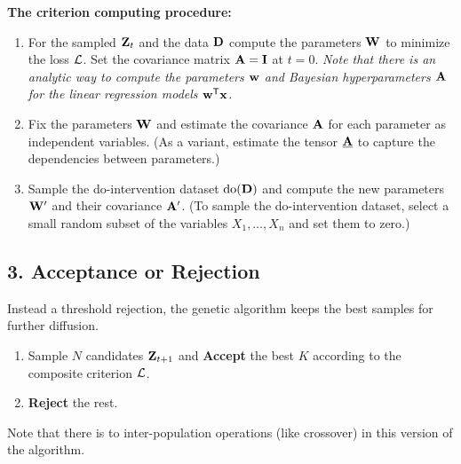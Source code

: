 \documentclass[12pt]{article}
\begin{document}
\clearpage
    \textbf{The criterion computing procedure:}
\begin{enumerate}
    \item For the sampled $\mathbf{Z}_t$ and the data $\mathbf{D}$ compute the parameters $\mathbf{W}$ to minimize the loss $\mathcal{L}$.
    Set the covariance matrix $\mathbf{A} = \mathbf{I}$ at $t=0$.
    \emph{Note that there is an analytic way to compute the parameters $\mathbf{w}$ and Bayesian hyperparameters $\mathbf{A}$ for the linear regression models $\mathbf{w}^{\mathsf{T}}\mathbf{x}$.}
    \item Fix the parameters $\mathbf{W}$ and estimate the covariance $\mathbf{A}$ for each parameter as independent variables.
    (As a variant, estimate the tensor $\underline{\mathbf{A}}$ to capture the dependencies between parameters.)
    \item Sample the do-intervention dataset $\mathrm{do}(\mathbf{D})$ and compute the new parameters $\mathbf{W}{^\prime}$ and their covariance $\mathbf{A}{^\prime}$.
    (To sample the do-intervention dataset, select a small random subset of the variables $X_1,\dots,X_n$ and set them to zero.)
\end{enumerate}

\subsection*{3. Acceptance or Rejection}
Instead a threshold rejection, the genetic algorithm keeps the best samples for further diffusion.
\begin{enumerate}
    \item Sample $N$ candidates $\mathbf{Z}_{t+1}$ and \textbf{Accept} the best $K$ according to the composite criterion $\mathcal{L}$.
    \item \textbf{Reject} the rest.
\end{enumerate}
Note that there is to inter-population operations (like crossover) in this version of the algorithm.
\end{document}
